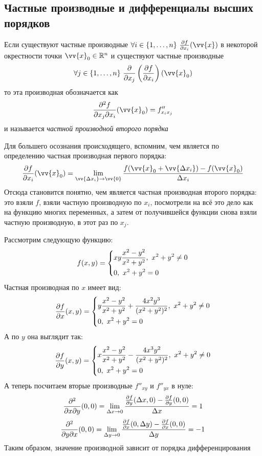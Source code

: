 \subsection{Частные производные и дифференциалы высших порядков}

\begin{definition}
	Если существуют частные производные $\forall i \in \range{n}\ \pd{f}{x_i} (\vv{x})$ в некоторой окрестности точки $\vv{x}_0 \in \R^n$ и существуют частные производные 
	\[
		\forall j \in \range{n}\ \frac{\vdelta}{\vdelta x_j} \left(\pd{f}{x_i}\right) (\vv{x}_0)
	\]
	то эта производная обозначается как
	\[
		\frac{\vdelta^2 f}{\vdelta x_j \vdelta x_i} (\vv{x}_0) = f''_{x_ix_j}
	\]
	и называется \textit{частной производной второго порядка}
\end{definition}

\begin{anote}
	Для большего осознания происходящего, вспомним, чем является по определению частная производная первого порядка:
	\[
		\pd{f}{x_i}(\vv{x}_0) = \liml_{\vv{\Delta x_i} \to \vv{0}} \frac{f(\vv{x}_0 + \vv{\Delta x_i}) - f(\vv{x}_0)}{\Delta x_i}
	\]
	Отсюда становится понятно, чем является частная производная второго порядка: это взяли $f$, взяли частную производную по $x_i$, посмотрели на всё это дело как на функцию многих переменных, а затем от получившейся функции снова взяли частную производную, в этот раз по $x_j$.
\end{anote}

\begin{example}
	Рассмотрим следующую функцию:
	\[
		f(x, y) = \left\{\begin{aligned}
			&{xy \frac{x^2 - y^2}{x^2 + y^2},\ x^2 + y^2 \neq 0}
			\\
			&{0,\ x^2 + y^2 = 0}
		\end{aligned}\right.
	\]
	Частная производная по $x$ имеет вид:
	\[
		\frac{\partial f}{\partial x} (x, y) = \left\{\begin{aligned}
			&{y \frac{x^2 - y^2}{x^2 + y^2} + \frac{4x^2 y^3}{(x^2 + y^2)^2},\ x^2 + y^2 \neq 0}
			\\
			&{0,\ x^2 + y^2 = 0}
		\end{aligned}\right.
	\]
	А по $y$ она выглядит так:
	\[
		\frac{\partial f}{\partial y} (x, y) = \left\{\begin{aligned}
			&{x \frac{x^2 - y^2}{x^2 + y^2} - \frac{4x^3 y^2}{(x^2 + y^2)^2},\ x^2 + y^2 \neq 0}
			\\
			&{0,\ x^2 + y^2 = 0}
		\end{aligned}\right.
	\]
	А теперь посчитаем вторые производные $f''_{xy}$ и $f''_{yx}$ в нуле:
	\[
		\frac{\partial^2}{\partial x \partial y}(0, 0) = \lim\limits_{\Delta x \to 0} \frac{\frac{\partial f}{\partial y}(\Delta x, 0) - \frac{\partial f}{\partial y}(0, 0)}{\Delta x} = 1
	\]
	\[
		\frac{\partial^2}{\partial y \partial x}(0, 0) = \lim\limits_{\Delta y \to 0} \frac{\frac{\partial f}{\partial x}(0, \Delta y) - \frac{\partial f}{\partial x}(0, 0)}{\Delta y} = -1
	\]
	Таким образом, значение производной зависит от порядка дифференцирования
\end{example}

